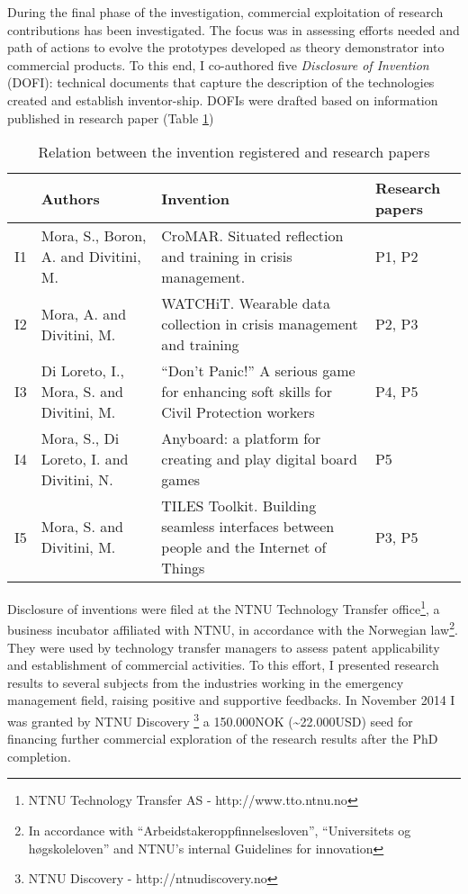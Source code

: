 During the final phase of the investigation, commercial exploitation of research contributions has been investigated. The focus was in assessing efforts needed and path of actions to evolve the prototypes developed as theory demonstrator into commercial products. To this end, I co-authored five \emph{Disclosure of Invention} (DOFI): technical documents that capture the description of the technologies created and establish inventor-ship. DOFIs were drafted based on information published in research paper (Table \ref{tab:papers-inventions})
\begin{table}
	[tbh] \centering \caption{Relation between the invention registered and research papers} \label{tab:papers-inventions} 
	\begin{tabular}
		{p{}p{}p{}p{}} \toprule & Authors & Invention & Research papers \\
		\midrule I1 & Mora, S., Boron, A. and Divitini, M. & CroMAR. Situated reflection and training in crisis management. & P1, P2 \\
		\noalign{\smallskip} I2 & Mora, A. and Divitini, M. & WATCHiT. Wearable data collection in crisis management and training & P2, P3 \\
		\noalign{\smallskip} I3 & Di Loreto, I., Mora, S. and Divitini, M. & ``Don’t Panic!'' A serious game for enhancing soft skills for Civil Protection workers & P4, P5 \\
		\noalign{\smallskip} I4 & Mora, S., Di Loreto, I. and Divitini, N. & Anyboard: a platform for creating and play digital board games & P5 \\
		\noalign{\smallskip} I5 & Mora, S. and Divitini, M. & TILES Toolkit. Building seamless interfaces between people and the Internet of Things & P3, P5 \\
		\bottomrule 
	\end{tabular}
\end{table}

Disclosure of inventions were filed at the NTNU Technology Transfer office\footnote{NTNU Technology Transfer AS - http://www.tto.ntnu.no}, a business incubator affiliated with NTNU, in accordance with the Norwegian law\footnote{In accordance with ``Arbeidstakeroppfinnelsesloven'', ``Universitets og høgskoleloven'' and NTNU's internal Guidelines for innovation}. They were used by technology transfer managers to assess patent applicability and establishment of commercial activities. To this effort, I presented research results to several subjects from the industries working in the emergency management field, raising positive and supportive feedbacks. In November 2014 I was granted by NTNU Discovery \footnote{NTNU Discovery - http://ntnudiscovery.no} a 150.000NOK (\textasciitilde{}22.000USD) seed for financing further commercial exploration of the research results after the PhD completion.

